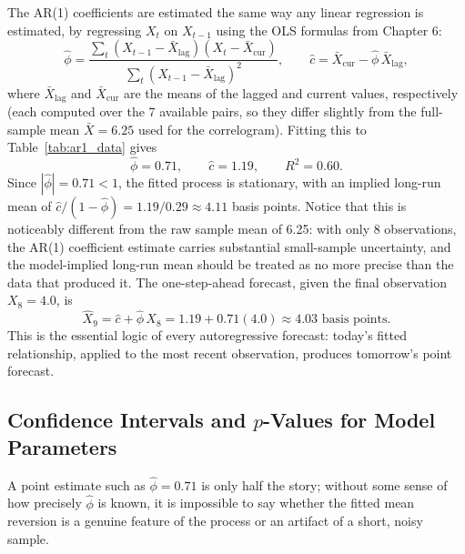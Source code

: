 \documentclass[../ai_in_finance]{subfiles}
\begin{document}
The AR(1) coefficients are estimated the same way any linear regression is estimated, by regressing $X_t$ on $X_{t-1}$ using the OLS formulas from Chapter 6:
\begin{equation*}
\hat\phi = \frac{\sum_t (X_{t-1}-\bar X_{\text{lag}})(X_t - \bar X_{\text{cur}})}{\sum_t (X_{t-1}-\bar X_{\text{lag}})^2}, \qquad \hat c = \bar X_{\text{cur}} - \hat\phi\, \bar X_{\text{lag}},
\end{equation*}
where $\bar X_{\text{lag}}$ and $\bar X_{\text{cur}}$ are the means of the lagged and current values, respectively (each computed over the 7 available pairs, so they differ slightly from the full-sample mean $\bar X = 6.25$ used for the correlogram). Fitting this to Table~\ref{tab:ar1_data} gives
\begin{equation*}
\hat\phi = 0.71, \qquad \hat c = 1.19, \qquad R^2 = 0.60.
\end{equation*}
Since $|\hat\phi| = 0.71 < 1$, the fitted process is stationary, with an implied long-run mean of $\hat c/(1-\hat\phi) = 1.19/0.29 \approx 4.11$ basis points. Notice that this is noticeably different from the raw sample mean of 6.25: with only 8 observations, the AR(1) coefficient estimate carries substantial small-sample uncertainty, and the model-implied long-run mean should be treated as no more precise than the data that produced it. The one-step-ahead forecast, given the final observation $X_8 = 4.0$, is
\begin{equation*}
\hat X_9 = \hat c + \hat\phi\, X_8 = 1.19 + 0.71(4.0) \approx 4.03 \text{ basis points}.
\end{equation*}
This is the essential logic of every autoregressive forecast: today's fitted relationship, applied to the most recent observation, produces tomorrow's point forecast.

\subsection{Confidence Intervals and $p$-Values for Model Parameters}
\label{sec:ci-pvalue}

A point estimate such as $\hat\phi = 0.71$ is only half the story; without some sense of how precisely $\hat\phi$ is known, it is impossible to say whether the fitted mean reversion is a genuine feature of the process or an artifact of a short, noisy sample.
\end{document}

